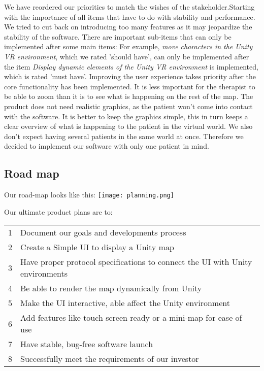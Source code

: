 \documentclass[11pt]{article}
\begin{document}
    \newline
    \newline
    We have reordered our priorities to match the wishes of the stakeholder.Starting with the importance of all items that have to do with stability and performance. We tried to cut back on introducing too many features as it may jeopardize the stability of the software.
    \newline
    There are important sub-items that can only be implemented after some main items: For example, \textit{move characters in the Unity VR environment}, which we rated 'should have', can only be implemented after the item \textit{Display dynamic elements of the Unity VR environment} is implemented, which is rated 'must have'.
    \newline
    Improving the user experience takes priority after the core functionality has been implemented. It is less important for the therapist to be able to zoom than it is to see what is happening on the rest of the map.
    \newline
    The product does not need realistic graphics, as the patient won't come into contact with the software. It is better to keep the graphics simple, this in turn keeps a clear overview of what is happening to the patient in the virtual world. We also don't expect having several patients in the same world at once. Therefore we decided to implement our software with only one patient in mind.
    
    \subsection{Road map}
    
    Our road-map looks like this:
    \newline
	\texttt{[image: planning.png]}
    \newpage
    
	Our ultimate product plans are to:
    \newline
    \begin{tabular}{ l l }
        \hline
        1& Document  our goals and developments process\\
        2& Create a Simple UI to display a Unity map\\
        3& Have proper protocol specifications to connect the UI with Unity environments \\
        4& Be able to render the map dynamically from Unity\\
        5& Make the UI interactive, able affect the Unity environment\\
        6& Add features like touch screen ready or a mini-map for ease of use\\
        7& Have stable, bug-free software launch\\
     	8& Successfully meet the requirements of our investor\\
	\end{tabular}
  
\end{document}
